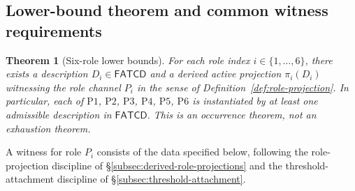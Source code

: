 \documentclass[11pt]{article}
\newtheorem{theorem}{Theorem}[section]
\theoremstyle{definition}
\newcommand{\FATCD}{\ensuremath{\mathsf{FATCD}}}
\newcommand{\Pone}{\ensuremath{\mathrm{P1}}}
\newcommand{\Ptwo}{\ensuremath{\mathrm{P2}}}
\newcommand{\Pthree}{\ensuremath{\mathrm{P3}}}
\newcommand{\Pfour}{\ensuremath{\mathrm{P4}}}
\newcommand{\Pfive}{\ensuremath{\mathrm{P5}}}
\newcommand{\Psix}{\ensuremath{\mathrm{P6}}}
\begin{document}
\subsection{Lower-bound theorem and common witness requirements}\label{subsec:lower-bound-theorem}

\begin{theorem}[Six-role lower bounds]\label{thm:six-role-lower-bounds}
For each role index \(i \in \{1,\ldots,6\}\), there exists a description
\(D_i \in \FATCD{}\) and a derived active projection
\(\pi_i(D_i)\) witnessing the role channel \(P_i\) in the sense of
Definition~\ref{def:role-projection}. In particular, each of
\Pone{}, \Ptwo{}, \Pthree{}, \Pfour{}, \Pfive{}, \Psix{} is instantiated
by at least one admissible description in \FATCD{}. This is an occurrence
theorem, not an exhaustion theorem.
\end{theorem}

A witness for role \(P_i\) consists of the data specified below,
following the role-projection discipline of
\S\ref{subsec:derived-role-projections} and the threshold-attachment
discipline of \S\ref{subsec:threshold-attachment}.
\end{document}
